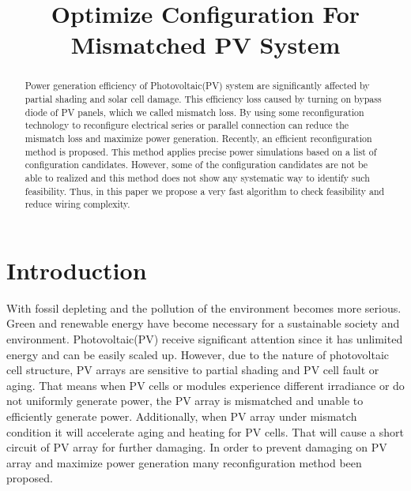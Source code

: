 \documentclass[conference]{IEEEtran}
\begin{document}
\title{Optimize Configuration For Mismatched PV System}
\author{
}
\maketitle

\begin{abstract}
Power generation efficiency of Photovoltaic(PV) system are significantly affected by partial shading and solar cell damage. This efficiency loss caused by turning on bypass diode of PV panels, which we called mismatch loss. By using some reconfiguration technology to reconfigure electrical series or parallel connection can reduce the mismatch loss and maximize power generation. Recently, an efficient reconfiguration method is proposed. This method applies precise power simulations based on a list of configuration candidates. However, some of the configuration candidates are not be able to realized and this method does not show any systematic way to identify such feasibility. Thus, in this paper we propose a very fast algorithm to check feasibility and reduce wiring complexity.
\end{abstract}


\section{Introduction}
With fossil depleting and the pollution of the environment becomes more serious. Green and renewable energy have become necessary for a sustainable society and environment. Photovoltaic(PV) receive significant attention since it has unlimited energy and can be easily scaled up. However, due to the nature of photovoltaic cell structure, PV arrays are sensitive to partial shading and PV cell fault or aging. That means when PV cells or modules experience different irradiance or do not uniformly generate power, the PV array is mismatched and unable to efficiently generate power. Additionally, when PV array under mismatch condition it will accelerate aging and heating for PV cells. That will cause a short circuit of PV array for further damaging. In order to prevent damaging on PV array and maximize power generation many reconfiguration method been proposed.
\end{document}
